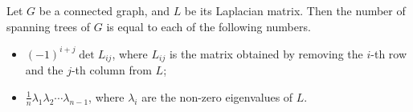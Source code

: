 

\setcounter{section}{2}
\setcounter{subsection}{5}
\setcounter{dfn}{15}

\begin{thm}[Kirchhoff]
Let $G$ be a connected graph, and $L$ be its Laplacian matrix.
Then the number of spanning trees of $G$ is equal to each of the following numbers.
\begin{itemize}
\item $(-1)^{i+j} \det L_{ij}$, where $L_{ij}$ is the matrix obtained by removing the $i$-th row and the $j$-th column from $L$;
\item $\frac{1}{n} \lambda_1 \lambda_2 \cdots \lambda_{n-1}$, where $\lambda_i$ are the non-zero eigenvalues of $L$.
\end{itemize}
\end{thm}

